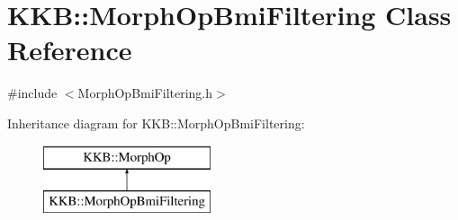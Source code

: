 \hypertarget{class_k_k_b_1_1_morph_op_bmi_filtering}{}\section{K\+KB\+:\+:Morph\+Op\+Bmi\+Filtering Class Reference}
\label{class_k_k_b_1_1_morph_op_bmi_filtering}


{\ttfamily \#include $<$Morph\+Op\+Bmi\+Filtering.\+h$>$}

Inheritance diagram for K\+KB\+:\+:Morph\+Op\+Bmi\+Filtering\+:\begin{figure}[H]
\begin{center}
\leavevmode
\includegraphics[height=2.000000cm]{class_k_k_b_1_1_morph_op_bmi_filtering}
\end{center}
\end{figure}

